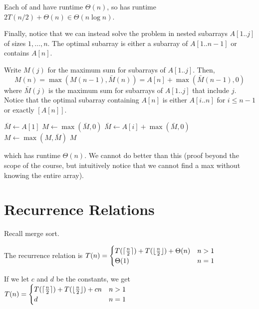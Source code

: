 Each of  and  have runtime $\Theta(n)$,
so  has runtime $2T(n/2) + \Theta(n) \in \Theta(n\log n)$.

Finally, notice that we can instead solve the problem in nested subarrays $A[1..j]$ of sizes $1,\dotsc,n$.
The optimal subarray is either a subarray of $A[1..n-1]$ or contains $A[n]$.

Write $M(j)$ for the maximum sum for subarrays of $A[1..j]$. Then,
\[ M(n) = \max(M(n-1), \bar M(n)) = A[n] + \max(\bar M(n-1), 0) \]
where $\bar M(j)$ is the maximum sum for subarrays of $A[1..j]$ that include $j$.
Notice that the optimal subarray containing $A[n]$ is either $A[i..n]$ for $i \leq n-1$
or exactly $[A[n]]$.

\begin{algorithm}[H]
  \caption{}
  \begin{algorithmic}[1]
    \State $\bar M \gets A[1]$
    \State $M \gets \max(\bar M, 0)$
    \State $\bar M \gets A[i] + \max(\bar M, 0)$
    \State $M \gets \max(M, \bar M)$
    \EndFor
    \State \Return $M$
  \end{algorithmic}
\end{algorithm}

which has runtime $\Theta(n)$.
We cannot do better than this (proof beyond the scope of the course,
but intuitively notice that we cannot find a max without knowing the entire array).

\section{Recurrence Relations}

Recall merge sort.

The recurrence relation is $T(n) = \begin{cases}
    T(\lceil\frac{n}{2}\rceil) + T(\lfloor\frac{n}{2}\rfloor) + \Theta(n) & n > 1 \\
    \Theta(1)                                                  & n = 1
  \end{cases}$

If we let $c$ and $d$ be the constants, we get $T(n) = \begin{cases}
    T(\lceil\frac{n}{2}\rceil) + T(\lfloor\frac{n}{2}\rfloor) + cn & n > 1 \\
    d                                                   & n = 1
  \end{cases}$


